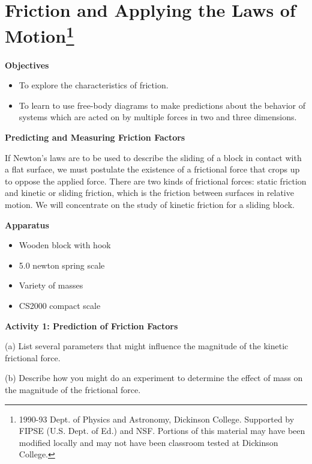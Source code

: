 
\section{Friction and Applying the Laws of Motion\footnote{
1990-93 Dept. of Physics and Astronomy, Dickinson College. Supported by FIPSE
(U.S. Dept. of Ed.) and NSF. Portions of this material may have been modified
locally and may not have been classroom tested at Dickinson College.
}}

\makelabheader %

\textbf{Objectives }

\begin{itemize}
\item To explore the characteristics of friction. 
\item To learn to use free-body diagrams to make predictions about the behavior of
systems which are acted on by multiple forces in two and three dimensions.
\end{itemize}
\textbf{Predicting and Measuring Friction Factors }

If Newton's laws are to be used to describe the sliding of a block in contact
with a flat surface, we must postulate the existence of a 
frictional
force that crops up to oppose the applied force. There are two kinds of frictional
forces: static friction and kinetic or sliding friction, which is the friction
between surfaces in relative motion. We will concentrate on the study of kinetic
friction for a sliding block.

\textbf{Apparatus }

\begin{itemize}
\item Wooden block with hook 
\item 5.0 newton spring scale 
\item Variety of masses 
\item CS2000 compact scale
\end{itemize}
\textbf{Activity 1: Prediction of Friction Factors }

(a) List several parameters that might influence the magnitude of the kinetic
frictional force.
\vspace{20mm}

(b) Describe how you might do an experiment to determine the effect of mass
on the magnitude of the frictional force.
\vspace{20mm}


